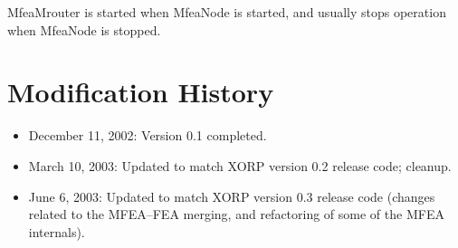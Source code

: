 \documentclass[11pt]{article}
\begin{document}
MfeaMrouter is started when MfeaNode is started, and usually stops
operation when MfeaNode is stopped.


\appendix
\section{Modification History}

\begin{itemize}

  \item December 11, 2002: Version 0.1 completed.

  \item March 10, 2003: Updated to match XORP version 0.2 release code;
  cleanup.

  \item June 6, 2003: Updated to match XORP version 0.3 release code
  (changes related to the MFEA--FEA merging, and refactoring of
  some of the MFEA internals).

\end{itemize}





\end{document}
